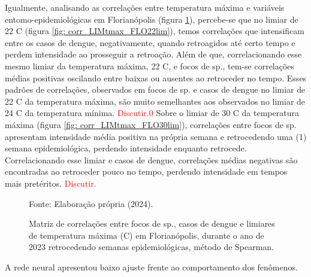 \documentclass[
	12pt,				%
	openright,			%
	oneside,			%
	a4paper,			%
	english,			%
	french,				%
	spanish,			%
	brazil				%
	dvipsnames, table]{abntex2}
\begin{document}
\indent Igualmente, analisando as correlações entre temperatura máxima e variáveis entomo-epidemiológicas em Florianópolis (figura \ref{fig: matriz_corr_LIMtmax_FLO}), percebe-se que no limiar de 22 C (figura \ref{fig: corr_LIMtmax_FLO22lim}), temos correlações que intensificam entre os casos de dengue, negativamente, quando retroagidos até certo tempo e perdem intensidade ao prosseguir a retroação. Além de que, correlacionando esse mesmo limiar da temperatura máxima, 22 C, e focos de  sp., tem-se correlações médias positivas oscilando entre baixas ou ausentes ao retroceder no tempo. Esses padrões de correlações, observados em focos de  sp. e casos de dengue no limiar de 22 C da temperatura máxima, são muito semelhantes aos observados no limiar de 24 C da temperatura mínima. \textcolor{red}{Discutir.0 }Sobre o limiar de 30 C da temperatura máxima (figura \ref{fig: corr_LIMtmax_FLO30lim}), correlações entre focos de  sp. apresentam intensidade média positiva na própria semana e retrocedendo uma (1) semana epidemiológica, perdendo intensidade enquanto retrocede. Correlacionando esse limiar e casos de dengue, correlações médias negativas são encontradas ao retroceder pouco no tempo, perdendo intensidade em tempos mais pretéritos. \textcolor{red}{Discutir.}

\begin{figure}[htbp]
    \begin{center}
    \caption{Matriz de correlações entre focos de  sp., casos de dengue e limiares de temperatura máxima (C) em Florianópolis, durante o ano de 2023 retrocedendo semanas epidemiológicas, método de Spearman.}
    \label{fig: matriz_corr_LIMtmax_FLO}
        \hfill
    \end{center}
    \small{Fonte: Elaboração própria (2024).}
\end{figure}







\newpage

\indent A rede neural apresentou baixo ajuste frente ao comportamento dos fenômenos.
\end{document}
